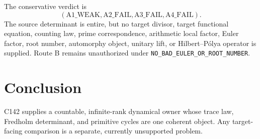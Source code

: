\documentclass[11pt]{article}
\begin{document}
The conservative verdict is
\[
 (\mathrm{A1\_WEAK},\mathrm{A2\_FAIL},\mathrm{A3\_FAIL},
 \mathrm{A4\_FAIL}).
\]
The source determinant is entire, but no target divisor, target functional
equation, counting law, prime correspondence, arithmetic local factor,
Euler factor, root number, automorphy object, unitary lift, or
Hilbert--P\'olya operator is supplied.  Route B remains unauthorized under
\texttt{NO\_BAD\_EULER\_OR\_ROOT\_NUMBER}.

\section{Conclusion}
C142 supplies a countable, infinite-rank dynamical owner whose trace law,
Fredholm determinant, and primitive cycles are one coherent object.  Any
target-facing comparison is a separate, currently unsupported problem.
\end{document}

